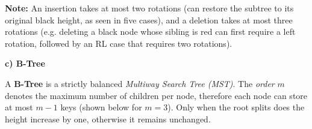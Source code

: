 \documentclass{article}
\begin{document}
\begin{figure}[H]
{
    }
\end{figure}

\textbf{Note:} An insertion takes at most two rotations (can restore the subtree to its original black height, as seen in five cases), and a deletion takes at most three rotations (e.g. deleting a black node whose sibling is red can first require a left rotation, followed by an RL case that requires two rotations).

\textbf{c) B-Tree}

A \textbf{B-Tree} is a strictly balanced \emph{Multiway Search Tree (MST)}. The \emph{order} $m$ denotes the maximum number of children per node, therefore each node can store at most $m−1$ keys (shown below for $m=3$). Only when the root splits does the height increase by one, otherwise it remains unchanged.

\vspace{-1ex}
\end{document}
